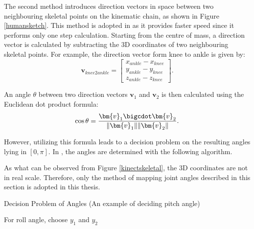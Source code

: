 The second method introduces direction vectors in space between two neighbouring skeletal points on the kinematic chain, as shown in Figure {\ref{humansketch}}. This method is adopted in {\cite{almetwally2013real}} as it provides faster speed since it performs only one step calculation. Starting from the centre of mass, a direction vector is calculated by subtracting the 3D coordinates of two neighbouring skeletal points. For example, the direction vector form knee to ankle is given by:
\begin{equation*}
\bm{v}_{\mathit{knee2ankle}}=\begin{bmatrix}
x_{\mathit{ankle}} - x_{\mathit{knee}}\\
y_{\mathit{ankle}} - y_{\mathit{knee}}\\
z_{\mathit{ankle}} - z_{\mathit{knee}}\
\end{bmatrix}.
\end{equation*}

An angle $ \theta $ between two direction vectors $ \bm{v}_1 $ and $ \bm{v}_2 $ is then calculated using the Euclidean dot product formula:
\begin{equation}
\cos\theta= \frac{\bm{v}_1 \bigcdot \bm{v}_2}{\Vert\bm{v}_1 \Vert \Vert \bm{v}_2 \Vert}.
\end{equation}

However, utilizing this formula leads to a decision problem on the resulting angles lying in $ \left[0,\pi\right] $. In \cite{almetwally2013real}, the angles are determined with the following algorithm. 

As what can be observed from Figure {\ref{kinectskeletal}}, the 3D coordinates are not in real scale. Therefore, only the method of mapping joint angles described in this section is adopted in this thesis. 
  
\begin{algorithm}[H]  
	\label{angledecide}
	\caption{Decision Problem of Angles (An example of deciding pitch angle)}
	\begin{algorithmic}[1]
		\STATE {}
		\STATE \text{$ \theta \gets -\theta $}
		\ENDIF
		\STATE For roll angle, choose $ y_1 $ and $ y_2 $
	\end{algorithmic}  
\end{algorithm}


